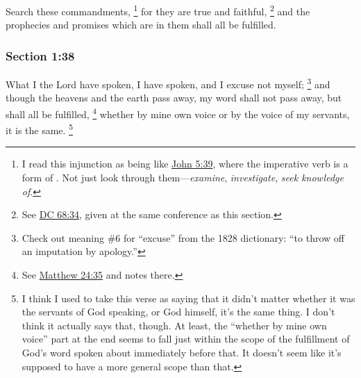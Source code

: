 		Search these commandments,%
			\footnote{%
				I read this injunction as being like \hyperref[JOHN-5-39]{John 5:39}, where the imperative verb is a form of \hyperref[ERAUNAO]{}. Not just look through them---\textit{examine}, \textit{investigate}, \textit{seek knowledge of}.
				}
		for they are true and faithful,%
			\footnote{%
				See \hyperref[DC68-34]{DC 68:34}, given at the same conference as this section.
				}
		and the prophecies and promises which are in them shall all be fulfilled.


	\subsubsection{Section 1:38} %
		\label{DC1-38}

		What I the Lord have spoken, I have spoken, and I excuse not myself;%
			\footnote{%
				Check out meaning \#6 for ``excuse'' from the 1828 dictionary: ``to throw off an imputation by apology.'' 
				}
		and though the heavens and the earth pass away, my word shall not pass away, but shall all be fulfilled,%
			\footnote{%
				See \hyperref[MATTHEW-24-35]{Matthew 24:35} and notes there.
				}
		whether by mine own voice or by the voice of my servants, it is the same.%
			\footnote{%
				I think I used to take this verse as saying that it didn't matter whether it was the servants of God speaking, or God himself, it's the same thing. I don't think it actually says that, though. At least, the ``whether by mine own voice'' part at the end seems to fall just within the scope of the fulfillment of God's word spoken about immediately before that. It doesn't seem like it's supposed to have a more general scope than that.
				}

